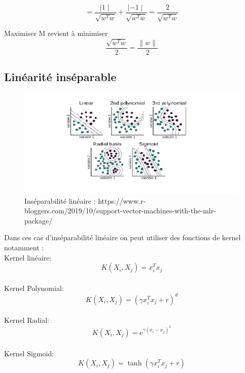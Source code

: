 \documentclass[12pt, letterpaper]{article}
\begin{document}
$$ = \frac{\mid{1}\mid}{\sqrt{w^{T}w} } + \frac{\mid{-1}\mid}{\sqrt{w^{T}w}} = \frac{2}{\sqrt{w^{T}w} }$$  
\par Maximiser M revient à minimiser $$\frac{\sqrt{w^{T}w}}{2} = \frac{\|w\|}{2}$$

\subsection{Linéarité inséparable}
\begin{figure}[H]
    \includegraphics[width=\linewidth]{images/svm_non_linear.png}
    \caption{Inséparabilité linéaire : https://www.r-bloggers.com/2019/10/support-vector-machines-with-the-mlr-package/}
    \label{fig:L1}
\end{figure}
\par Dans ces cas d’inséparabilité linéaire on peut utiliser des fonctions de kernel notamment :\\
Kernel linéaire: $$  K(X_{i},X_{j})=x_i^T x_j$$\\
Kernel Polynomial:  $$K(X_i,X_j ) = (\gamma x_i^T x_j+r)^d$$\\
Kernel Radial: $$K(X_i,X_j ) = \mathrm{e}^{\gamma(x_i-x_j )^2}$$\\
Kernel Sigmoid: $$K(X_i,X_j )= \tanh{(\gamma x_i^T x_j+r)}$$
\end{document}
